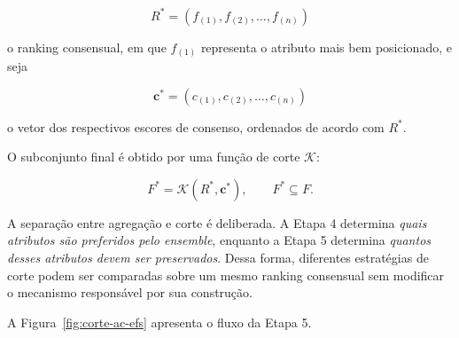 \begin{equation}
    R^{*}
    =
    \left(
        f_{(1)},f_{(2)},\ldots,f_{(n)}
    \right)
\end{equation}

o ranking consensual, em que $f_{(1)}$ representa o atributo mais bem
posicionado, e seja

\begin{equation}
    \mathbf{c}^{*}
    =
    \left(
        c_{(1)},c_{(2)},\ldots,c_{(n)}
    \right)
\end{equation}

o vetor dos respectivos escores de consenso, ordenados de acordo com
$R^{*}$.

O subconjunto final é obtido por uma função de corte $\mathcal{K}$:

\begin{equation}
    F^{*}
    =
    \mathcal{K}
    \left(
        R^{*},\mathbf{c}^{*}
    \right),
    \qquad
    F^{*}\subseteq F.
    \label{eq:funcao-corte-ac-efs}
\end{equation}

A separação entre agregação e corte é deliberada. A Etapa 4 determina
\textit{quais atributos são preferidos pelo ensemble}, enquanto a Etapa 5
determina \textit{quantos desses atributos devem ser preservados}. Dessa forma,
diferentes estratégias de corte podem ser comparadas sobre um mesmo ranking
consensual sem modificar o mecanismo responsável por sua construção.

A Figura~\ref{fig:corte-ac-efs} apresenta o fluxo da Etapa 5.

